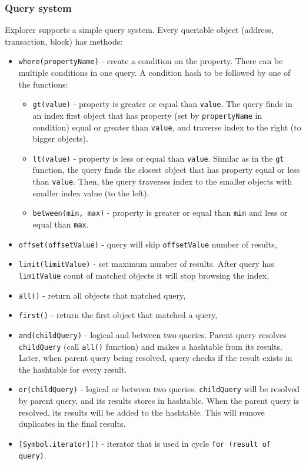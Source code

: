 \subsubsection{Query system}
Explorer supports a simple query system. Every queriable object (address, transaction, block) has methods:
\begin{itemize}
    \item \texttt{where(propertyName)} - create a condition on the property. There can be multiple conditions in one query. A condition hash to be followed by one of the functions: 
    \begin{itemize}
        \item \texttt{gt(value)} - property is greater or equal than \texttt{value}. The query finds in an index first object that has property (set by \texttt{propertyName} in condition) equal or greater than \texttt{value}, and traverse index to the right (to bigger objects).
        \item \texttt{lt(value)} - property is less or equal than \texttt{value}. Similar as in the \texttt{gt} function, the query finds the closest object that has property equal or less than \texttt{value}. Then, the query traverses index to the smaller objects with smaller index value (to the left).
        \item \texttt{between(min, max)} - property is greater or equal than \texttt{min} and less or equal than \texttt{max}. 
    \end{itemize}
    \item \texttt{offset(offsetValue)} - query will skip \texttt{offsetValue} number of results,
    \item \texttt{limit(limitValue)} - set maximum number of results. After query has \texttt{limitValue} count of matched objects it will stop browsing the index,
    \item \texttt{all()} - return all objects that matched query,
    \item \texttt{first()} - return the first object that matched a query,
    \item \texttt{and(childQuery)} - logical and between two queries. Parent query resolves \texttt{childQuery} (call \texttt{all()} function) and makes a hashtable from its results. Later, when parent query being resolved, query checks if the result exists in the hashtable for every result.
    \item \texttt{or(childQuery)} - logical or between two queries. \texttt{childQuery} will be resolved by parent query, and its results stores in hashtable. When the parent query is resolved, its results will be added to the hashtable. This will remove duplicates in the final results.
    \item \texttt{[Symbol.iterator]()} - iterator that is used in cycle \texttt{for (result of query)}.

\end{itemize}

